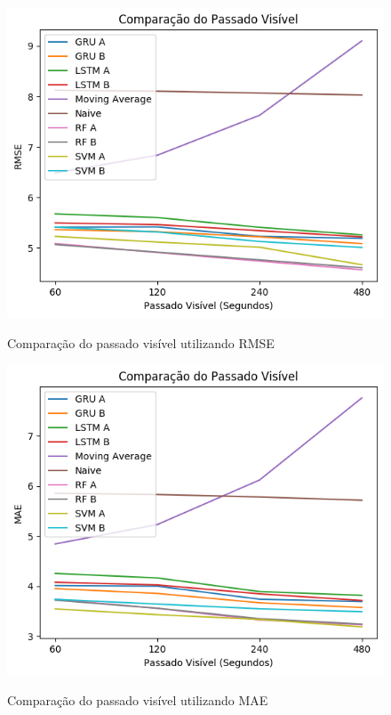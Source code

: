 
\begin{figure}[htbp]
    \centering
    \includegraphics[scale=0.8]{monography/img/comparisons/comparacao_do_passado_visivel_rmse.png}
    \label{figure:passado_visivel_rmse}
    \caption{Comparação do passado visível utilizando RMSE}
\end{figure}

\begin{figure}[htbp]
    \centering
    \includegraphics[scale=0.8]{monography/img/comparisons/comparacao_do_passado_visivel_mae.png}
    \label{figure:passado_visivel_mae}
    \caption{Comparação do passado visível utilizando MAE}
\end{figure}

